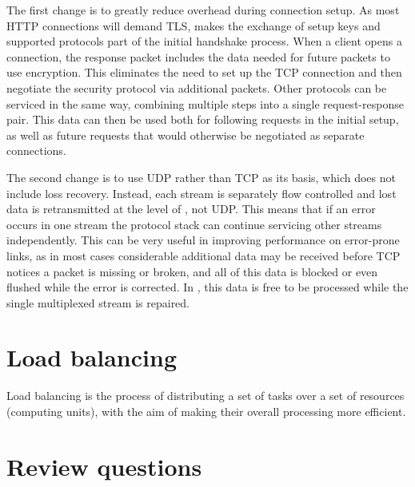 The first change is to greatly reduce overhead during connection setup.
As most \acs{HTTP} connections will demand \acs{TLS},  makes the exchange of setup keys and supported protocols part of the initial handshake process.
When a client opens a connection, the response packet includes the data needed for future packets to use encryption.
This eliminates the need to set up the \acs{TCP} connection and then negotiate the security protocol via additional packets.
Other protocols can be serviced in the same way, combining multiple steps into a single request-response pair.
This data can then be used both for following requests in the initial setup, as well as future requests that would otherwise be negotiated as separate connections.

The second change is to use \acs{UDP} rather than \acs{TCP} as its basis, which does not include loss recovery.
Instead, each  stream is separately flow controlled and lost data is retransmitted at the level of , not \acs{UDP}.
This means that if an error occurs in one stream the protocol stack can continue servicing other streams independently.
This can be very useful in improving performance on error-prone links, as in most cases considerable additional data may be received before \acs{TCP} notices a packet is missing or broken, and all of this data is blocked or even flushed while the error is corrected.
In , this data is free to be processed while the single multiplexed stream is repaired.


\section{Load balancing}
Load balancing is the process of distributing a set of tasks over a set of resources (computing units), with the aim of making their overall processing more efficient.


\section{Review questions}
\label{sec:transport-review-qu}

